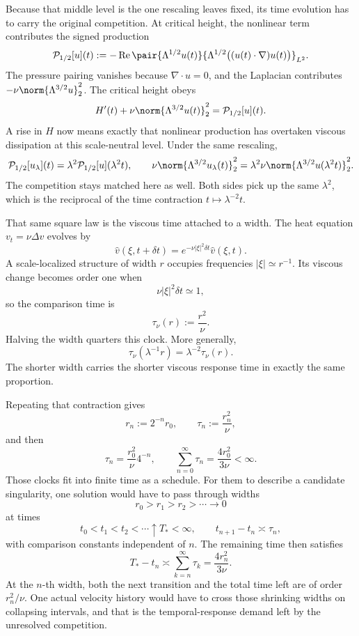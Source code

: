 
Because that middle level is the one rescaling leaves fixed, its time evolution has to carry the original competition. At critical height, the nonlinear term contributes the signed production
\[
  \mathcal P_{1/2}[u](t)
  :=
  -\operatorname{Re}
  \pair
    {\Lambda^{1/2}u(t)}
    {\Lambda^{1/2}\bigl((u(t)\cdot\nabla)u(t)\bigr)}_{L^2}.
\]
The pressure pairing vanishes because \(\nabla\cdot u=0\), and the Laplacian contributes \(-\nu\norm{\Lambda^{3/2}u}_2^2\). The critical height obeys
\[
  H'(t)
  +
  \nu\norm{\Lambda^{3/2}u(t)}_2^2
  =
  \mathcal P_{1/2}[u](t).
\]
A rise in \(H\) now means exactly that nonlinear production has overtaken viscous dissipation at this scale-neutral level. Under the same rescaling,
\[
  \mathcal P_{1/2}[u_\lambda](t)
  =
  \lambda^2\mathcal P_{1/2}[u](\lambda^2t),
  \qquad
  \nu\norm{\Lambda^{3/2}u_\lambda(t)}_2^2
  =
  \lambda^2\nu\norm{\Lambda^{3/2}u(\lambda^2t)}_2^2.
\]
The competition stays matched here as well. Both sides pick up the same \(\lambda^2\), which is the reciprocal of the time contraction \(t\mapsto\lambda^{-2}t\).


That same square law is the viscous time attached to a width. The heat equation \(v_t=\nu\Delta v\) evolves by
\[
  \widehat v(\xi,t+\delta t)
  =
  e^{-\nu|\xi|^2\delta t}\widehat v(\xi,t).
\]
A scale-localized structure of width \(r\) occupies frequencies \(|\xi|\simeq r^{-1}\). Its viscous change becomes order one when
\[
  \nu|\xi|^2\delta t\simeq1,
\]
so the comparison time is
\[
  \tau_\nu(r)
  :=
  \frac{r^2}{\nu}.
\]
Halving the width quarters this clock. More generally,
\[
  \tau_\nu(\lambda^{-1}r)
  =
  \lambda^{-2}\tau_\nu(r).
\]
The shorter width carries the shorter viscous response time in exactly the same proportion.


Repeating that contraction gives
\[
  r_n:=2^{-n}r_0,
  \qquad
  \tau_n:=\frac{r_n^2}{\nu},
\]
and then
\[
  \tau_n
  =
  \frac{r_0^2}{\nu}4^{-n},
  \qquad
  \sum_{n=0}^{\infty}\tau_n
  =
  \frac{4r_0^2}{3\nu}
  <
  \infty.
\]
Those clocks fit into finite time as a schedule. For them to describe a candidate singularity, one \NavierStokes{} solution would have to pass through widths
\[
  r_0>r_1>r_2>\cdots\longrightarrow0
\]
at times
\[
  t_0<t_1<t_2<\cdots\uparrow T_*<\infty,
  \qquad
  t_{n+1}-t_n\asymp\tau_n,
\]
with comparison constants independent of \(n\). The remaining time then satisfies
\[
  T_*-t_n
  \asymp
  \sum_{k=n}^{\infty}\tau_k
  =
  \frac{4r_n^2}{3\nu}.
\]
At the \(n\)-th width, both the next transition and the total time left are of order \(r_n^2/\nu\). One actual velocity history would have to cross those shrinking widths on collapsing intervals, and that is the temporal-response demand left by the unresolved competition.

